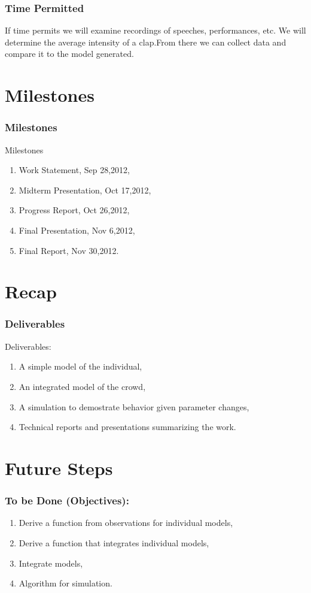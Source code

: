 \documentclass[compress,handout,10pt]{beamer}
\let\olditem\item
\renewcommand{\item}{\setlength{\itemsep}{0.5\baselineskip}\olditem}
\begin{document}
\begin{frame}
\frametitle{Time Permitted}
If time permits we will examine recordings of speeches, performances, etc. We will determine the average intensity of a clap.From there we can collect data and compare it to the model generated.\\
\end{frame}

\section{Milestones}
\begin{frame}
\frametitle{Milestones}
Milestones
\begin{enumerate}
                 \item Work Statement, Sep 28,2012,
                 \item Midterm Presentation, Oct 17,2012,
                 \item Progress Report, Oct 26,2012,
                 \item Final Presentation, Nov 6,2012,
                 \item Final Report, Nov 30,2012.
             \end{enumerate}

\end{frame}
\section{Recap}
\begin{frame}
\frametitle{ Deliverables}
 Deliverables:
 \vspace{7pt}
	\begin{enumerate}
		\item A simple model of the individual,
		\item An integrated model of the crowd,
		\item A simulation to demostrate behavior given parameter changes,
		\item Technical reports and presentations summarizing the work.
	\end{enumerate}
\end{frame}
\section{Future Steps}
\begin{frame}

  \frametitle{To be Done (Objectives):}
	\begin{enumerate}
		\item Derive a function from observations for individual models,
		\item Derive a function that integrates individual models,
		\item Integrate models,
		\item Algorithm for simulation.
	\end{enumerate}
\end{frame}
\end{document}
